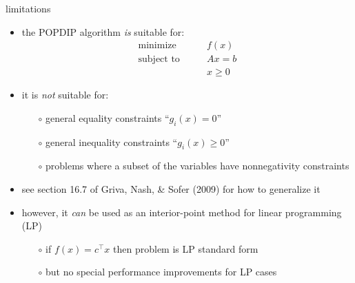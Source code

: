 \documentclass[10pt,hyperref,dvipsnames]{beamer}
\begin{document}
\begin{frame}{limitations}

\begin{itemize}
\item the POPDIP algorithm \emph{is} suitable for:
\begin{equation*}
\begin{matrix}
\text{minimize} \qquad   & f(x) \\
\text{subject to} \qquad & A x = b \\
                         & x \ge 0
\end{matrix}
\end{equation*}
\item it is \emph{not} suitable for:
    \begin{itemize}
    \item[$\circ$] general equality constraints ``$g_i(x)=0$''
    \item[$\circ$] general inequality constraints ``$g_i(x)\ge 0$''
    \item[$\circ$] problems where a subset of the variables have nonnegativity constraints
    \end{itemize}
\item see section 16.7 of Griva, Nash, \& Sofer (2009) for how to generalize it

\medskip
\item however, it \emph{can} be used as an interior-point method for linear programming (LP)
    \begin{itemize}
    \item[$\circ$] if $f(x)=c^\top x$ then problem is LP standard form
    \item[$\circ$] but no special performance improvements for LP cases
    \end{itemize}
\end{itemize}
\end{frame}
\end{document}
